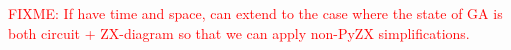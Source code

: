 \textcolor{red}{FIXME: If have time and space, can extend to the case where the state of GA is both circuit + ZX-diagram so that we can apply non-PyZX simplifications.}










